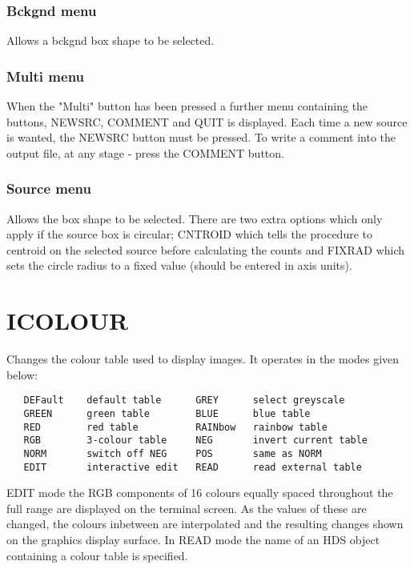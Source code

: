 \documentclass{book}
\renewcommand{\_}{{\tt\char'137}}     %
\begin{document}
\subsubsection{Bckgnd menu}
Allows a bckgnd box shape to be selected.
 
\subsubsection{Multi menu}
When the "Multi" button has been pressed a further menu containing
the buttons, NEWSRC, COMMENT and QUIT is displayed. Each time a
new source is wanted, the NEWSRC button must be pressed. To write
a comment into the output file, at any stage - press the COMMENT
button. 
 
\subsubsection{Source menu}
Allows the box shape to be selected. There are two extra options
which only apply if the source box is circular; CNTROID which
tells the procedure to centroid on the selected source before
calculating the counts and FIXRAD which sets the circle radius
to a fixed value (should be entered in axis units).
 
\section{ICOLOUR}
Changes the colour table used to display images. It operates
in the modes given below:
 
\begin{verbatim}
   DEFault    default table      GREY      select greyscale
   GREEN      green table        BLUE      blue table
   RED        red table          RAINbow   rainbow table
   RGB        3-colour table     NEG       invert current table
   NORM       switch off NEG     POS       same as NORM
   EDIT       interactive edit   READ      read external table
 \end{verbatim}
EDIT mode the RGB components of 16 colours equally spaced
throughout the full range are displayed on the terminal screen.
As the values of these are changed, the colours inbetween are
interpolated and the resulting changes shown on the graphics
display surface. In READ mode the name of an HDS object
containing a colour table is specified.
 
\end{document}

